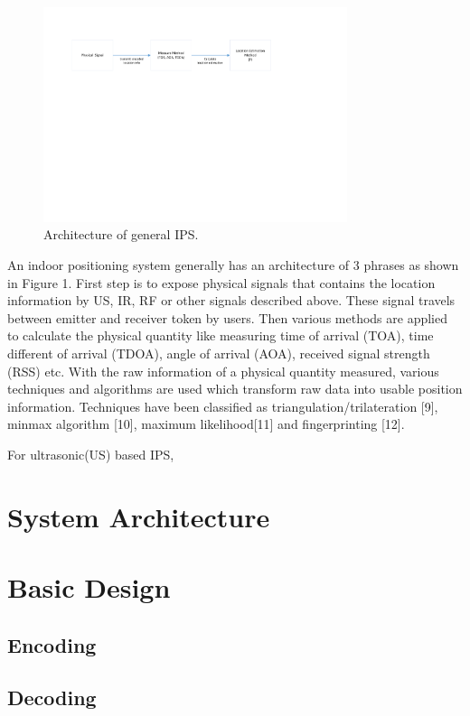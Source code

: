 \documentclass[conference]{IEEEtran}
\begin{document}
	
	\begin{figure}
	\centering
	\includegraphics[width=3.5in]{img/fig1.pdf}
	\caption{Architecture of general IPS.}
	\label{fig_sim}
	\end{figure}
	
  
	
	
	An indoor positioning system generally has an architecture of 3 phrases as shown in Figure 1. First step is to expose physical signals that contains the location information by US, IR, RF or other signals described above. These signal travels between emitter and receiver token by users. Then various methods are applied to calculate the physical quantity like measuring time of arrival (TOA), time different of arrival (TDOA), angle of arrival (AOA), received signal strength (RSS) etc. With the raw information of a physical quantity measured, various techniques and algorithms are used which transform raw data into usable position information. Techniques have been classified as triangulation/trilateration [9], minmax algorithm [10], maximum likelihood[11] and fingerprinting [12].
	
	
	For ultrasonic(US) based IPS, 



\section{System Architecture}

\section{Basic Design}
\subsection{Encoding}
\subsection{Decoding}
\end{document}

